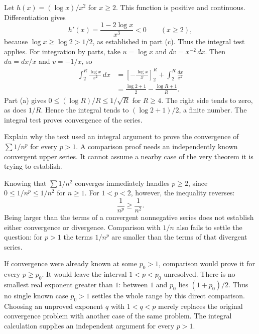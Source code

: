 Let $h(x)=(\log x)/x^2$ for $x\ge2$. This function is positive
and continuous. Differentiation gives
\[
 h'(x)=\frac{1-2\log x}{x^3}<0\qquad(x\ge2),
\]
because $\log x\ge\log2>1/2$, as established in part (c).
Thus the integral test applies. For integration by parts, take
$u=\log x$ and $dv=x^{-2}\,dx$. Then $du=dx/x$ and $v=-1/x$,
so
\[
 \begin{aligned}
 \int_2^R\frac{\log x}{x^2}\,dx
 &=\left[-\frac{\log x}{x}\right]_2^R
      +\int_2^R\frac{dx}{x^2}\\
 &=\frac{\log2+1}{2}-\frac{\log R+1}{R}.
 \end{aligned}
\]
Part (a) gives $0\le(\log R)/R\le1/\sqrt R$ for $R\ge4$.
The right side tends to zero, as does $1/R$. Hence the integral
tends to $(\log2+1)/2$, a finite number. The integral test proves
convergence of the series.

\goal Explain why the text used an integral argument to prove the
convergence of $\sum 1/n^p$ for every $p>1$.
\idea A comparison proof needs an independently known convergent
upper series. It cannot assume a nearby case of the very theorem
it is trying to establish.

Knowing that $\sum1/n^2$ converges immediately handles $p\ge2$,
since $0\le1/n^p\le1/n^2$ for $n\ge1$. For $1<p<2$, however,
the inequality reverses:
\[
 \frac1{n^p}\ge\frac1{n^2}.
\]
Being larger than the terms of a convergent nonnegative series
does not establish either convergence or divergence. Comparison
with $1/n$ also fails to settle the question: for $p>1$ the terms
$1/n^p$ are smaller than the terms of that divergent series.

If convergence were already known at some $p_0>1$, comparison
would prove it for every $p\ge p_0$. It would leave the interval
$1<p<p_0$ unresolved. There is no smallest real exponent greater
than $1$: between $1$ and $p_0$ lies $(1+p_0)/2$.
Thus no single known case $p_0>1$ settles the whole range by this
direct comparison. Choosing an unproved exponent $q$ with
$1<q<p$ merely replaces the original convergence problem with
another case of the same problem. The integral calculation supplies
an independent argument for every $p>1$.

